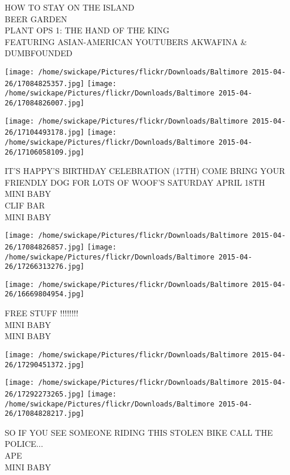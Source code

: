 \documentclass[10pt,letterpaper]{article}
\begin{document}
HOW TO STAY ON THE ISLAND\\
BEER GARDEN\\
PLANT OPS 1: THE HAND OF THE KING\\
FEATURING ASIAN{-}AMERICAN YOUTUBERS AKWAFINA \& DUMBFOUNDED\\
\pagebreak

\texttt{[image: /home/swickape/Pictures/flickr/Downloads/Baltimore 2015-04-26/17084825357.jpg]}
\texttt{[image: /home/swickape/Pictures/flickr/Downloads/Baltimore 2015-04-26/17084826007.jpg]}

\texttt{[image: /home/swickape/Pictures/flickr/Downloads/Baltimore 2015-04-26/17104493178.jpg]}
\texttt{[image: /home/swickape/Pictures/flickr/Downloads/Baltimore 2015-04-26/17106058109.jpg]}

IT'S HAPPY'S BIRTHDAY CELEBRATION (17TH) COME BRING YOUR FRIENDLY DOG FOR LOTS OF WOOF'S SATURDAY APRIL 18TH\\
MINI BABY\\
CLIF BAR\\
MINI BABY\\
\pagebreak

\texttt{[image: /home/swickape/Pictures/flickr/Downloads/Baltimore 2015-04-26/17084826857.jpg]}
\texttt{[image: /home/swickape/Pictures/flickr/Downloads/Baltimore 2015-04-26/17266313276.jpg]}

\texttt{[image: /home/swickape/Pictures/flickr/Downloads/Baltimore 2015-04-26/16669804954.jpg]}

FREE STUFF !!!!!!!!\\
MINI BABY\\
MINI BABY\\
\pagebreak

\texttt{[image: /home/swickape/Pictures/flickr/Downloads/Baltimore 2015-04-26/17290451372.jpg]}

\vspace{0.25in}
\texttt{[image: /home/swickape/Pictures/flickr/Downloads/Baltimore 2015-04-26/17292273265.jpg]}
\texttt{[image: /home/swickape/Pictures/flickr/Downloads/Baltimore 2015-04-26/17084828217.jpg]}

SO IF YOU SEE SOMEONE RIDING THIS STOLEN BIKE CALL THE POLICE...\\
APE\\
MINI BABY\\
\pagebreak
\end{document}

